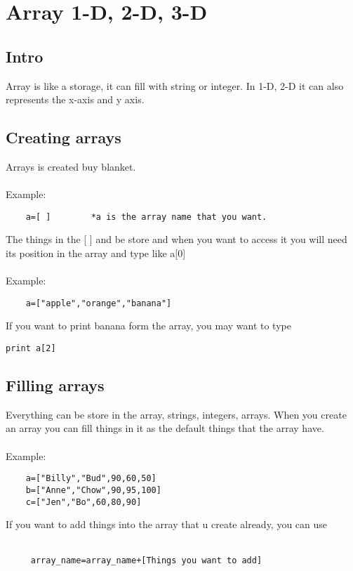 \chapter{Array 1-D, 2-D, 3-D}
\section{Intro}
	Array is like a storage, it can fill with string or integer. In 1-D, 2-D it can also represents the x-axis and y axis.
\section{Creating arrays}
	Arrays is created buy blanket.\\ \ \\
\noindent Example:\\
\begin{verbatim}
	a=[ ]        *a is the array name that you want.
\end{verbatim}
The things in the [ ] and be store and when you want to access it you will need its position in the array and type like  a[0]\\ \ \\
\noindent Example:\\
\begin{verbatim}
	a=["apple","orange","banana"]
\end{verbatim}
If you want to print banana form the array, you may want to type\\
\begin{verbatim}
print a[2] 
\end{verbatim}
\section{Filling arrays}
	Everything can be store in the array, strings, integers, arrays. When you create an array you can fill things in it as the default  things that the array have.\\ \ \\
\noindent Example:
\begin{verbatim}
    a=["Billy","Bud",90,60,50]
    b=["Anne","Chow",90,95,100]
    c=["Jen","Bo",60,80,90]
\end{verbatim}

If you want to add things into the array that u create already, you can use \\ \ \\

\begin{verbatim}
     array_name=array_name+[Things you want to add]
\end{verbatim}


